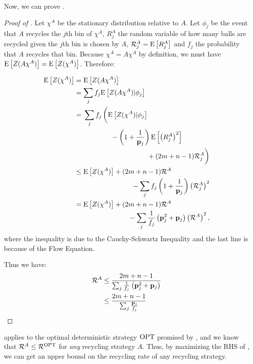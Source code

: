 Now, we can prove .

\begin{proof}[Proof of ]
	Let $\chi^A$ be the stationary distribution relative to $A$. Let $\phi_j$
	be the event that $A$ recycles the $j$th bin of $\chi^A$, $R_j^A$ the
	random variable of how many balls are recycled given the $j$th bin is
	chosen by $A$, $\mathcal{R}_j^A=\mathrm{E}\left[R_j^A\right]$ and $f_j$ the probability that
	$A$ recycles that bin.  Because $\chi^A = A\chi^A$ by definition, we must
	have $\mathrm{E}\left[Z(A\chi^A)\right] = \mathrm{E}\left[Z(\chi^A)\right]$. Therefore:

	\begin{align*}
	\E{Z(\chi^A)} &= \E{Z(A\chi^A)}\\
	  			  &= \sum_j f_j \E{Z(A\chi^A)|\phi_j} \\
				  &= \begin{multlined}[t][6.5cm]\sum_j f_j \left(\E{Z(\chi^A)|\phi_j}
					  \vphantom{\left(1+\frac{1}{\p_j}\right)} \right. \\
					  - \left(1+\frac{1}{\p_j}\right)\E{\left(R_j^A\right)^2} \\
					  \left. \vphantom{\left(1+\frac{1}{\p_j}\right)} + (2m+n-1)\mathcal{R}_j^A\right) \end{multlined} \\
				  &\leq \begin{multlined}[t][6.5cm]\E{Z(\chi^A)} + (2m+n-1)\mathcal{R}^A \\
					  - \sum_j f_j\left(1 +\frac{1}{\p_j}\right)\left(\mathcal{R}_j^A\right)^2 \end{multlined} \\
				  &= \begin{multlined}[t][6.5cm]\E{Z(\chi^A)} + (2m+n-1)\mathcal{R}^A \\
					  - \sum_j \frac{1}{f_j}\left(\p_j^2 +\p_j\right)\left(\mathcal{R}^A\right)^2, \end{multlined}
	\end{align*}
	where the inequality is due to the Cauchy-Schwartz Inequality and the last
	line is because of the Flow Equation.
	
	Thus we have:
	\begin{align*}
		\mathcal{R}^A &\leq \frac{2m+n-1}{\sum_j \frac{1}{f_j}\left(\mathbf{p}_j^2 +\mathbf{p}_j\right)} \\
					&\leq \frac{2m+n-1}{\sum_j \frac{\mathbf{p}_j}{f_j}}
	\end{align*}
\end{proof}

 applies to the optimal deterministic strategy $\textrm{OPT}$
promised by , and we know that $\mathcal{R}^A\leq
\mathcal{R}^{\textrm{OPT}}$ for \textit{any} recycling strategy $A$.  Thus, by maximizing
the RHS of , we can get an upper bound on the recycling
rate of any recycling strategy.

